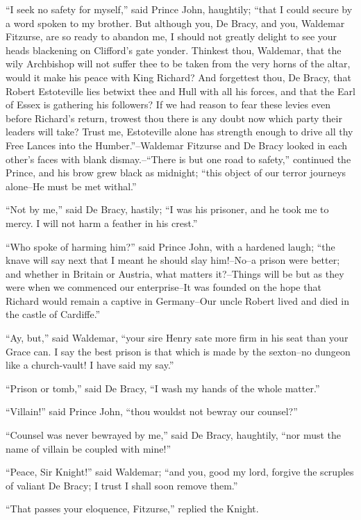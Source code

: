 ``I seek no safety for myself,'' said Prince John, haughtily; ``that I
could secure by a word spoken to my brother. But although you, De Bracy,
and you, Waldemar Fitzurse, are so ready to abandon me, I should not
greatly delight to see your heads blackening on Clifford's gate yonder.
Thinkest thou, Waldemar, that the wily Archbishop will not suffer thee
to be taken from the very horns of the altar, would it make his peace
with King Richard? And forgettest thou, De Bracy, that Robert
Estoteville lies betwixt thee and Hull with all his forces, and that the
Earl of Essex is gathering his followers? If we had reason to fear these
levies even before Richard's return, trowest thou there is any doubt now
which party their leaders will take? Trust me, Estoteville alone has
strength enough to drive all thy Free Lances into the
Humber.''--Waldemar Fitzurse and De Bracy looked in each other's faces
with blank dismay.--``There is but one road to safety,'' continued the
Prince, and his brow grew black as midnight; ``this object of our terror
journeys alone--He must be met withal.''

``Not by me,'' said De Bracy, hastily; ``I was his prisoner, and he took
me to mercy. I will not harm a feather in his crest.''

``Who spoke of harming him?'' said Prince John, with a hardened laugh;
``the knave will say next that I meant he should slay him!--No--a prison
were better; and whether in Britain or Austria, what matters it?--Things
will be but as they were when we commenced our enterprise--It was
founded on the hope that Richard would remain a captive in Germany--Our
uncle Robert lived and died in the castle of Cardiffe.''

``Ay, but,'' said Waldemar, ``your sire Henry sate more firm in his seat
than your Grace can. I say the best prison is that which is made by the
sexton--no dungeon like a church-vault! I have said my say.''

``Prison or tomb,'' said De Bracy, ``I wash my hands of the whole
matter.''

``Villain!'' said Prince John, ``thou wouldst not bewray our counsel?''

``Counsel was never bewrayed by me,'' said De Bracy, haughtily, ``nor
must the name of villain be coupled with mine!''

``Peace, Sir Knight!'' said Waldemar; ``and you, good my lord, forgive
the scruples of valiant De Bracy; I trust I shall soon remove them.''

``That passes your eloquence, Fitzurse,'' replied the Knight.


